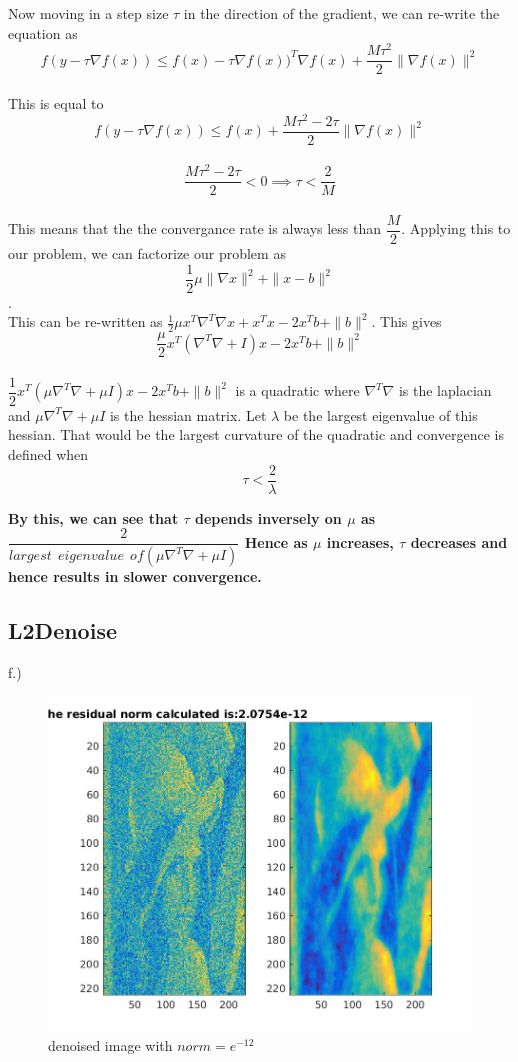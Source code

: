 \documentclass{article}
\begin{document}
Now moving in a step size $\tau$ in the direction of the gradient, we can re-write the equation as
$$f(y- \tau \nabla f(x)) \leq f(x) - \tau \nabla f(x))^T \nabla f(x) +\dfrac{M \tau^2}{2}\| \nabla f(x)\|^2$$ \\

This is equal to $$f(y- \tau \nabla f(x)) \leq f(x) + \dfrac{M \tau^2 -2 \tau}{2}\| \nabla f(x)\|^2$$\\

 $$\dfrac{M \tau^2 -2 \tau}{2} < 0 \implies \tau < \dfrac{2}{M}$$\\

This means that the the convergance rate is always less than $\dfrac{M}{2}$. Applying this to our problem, we can factorize our problem as $$\frac{1}{2} \mu \|\nabla x\|^2 + \|x - b\|^2 $$. \\

This can be re-written as $\frac{1}{2} \mu x^T \nabla^T \nabla x + x^Tx -2x^Tb + \|b\|^2$. This gives $$ \dfrac{\mu }{2} x^T(\nabla^T \nabla + I)x -2x^Tb + \|b\|^2$$\\

$ \dfrac{1}{2} x^T(\mu \nabla^T \nabla + \mu I)x -2x^Tb + \|b\|^2$ is a quadratic where $\nabla^T \nabla$ is the laplacian and $\mu \nabla^T \nabla + \mu I$ is the hessian matrix. Let $\lambda $ be the largest eigenvalue of this hessian. That would be the largest curvature of the quadratic and convergence is defined when $$\tau < \dfrac{2}{\lambda}$$

\textbf{By this, we can see that $\tau$ depends inversely on $\mu$ as $\dfrac{2}{largest\ \ eigenvalue\ \ of(\mu \nabla^T \nabla + \mu I)}$ Hence as $\mu$ increases, $\tau$ decreases and hence results in slower convergence.}


\subsection{L2Denoise}
f.)
\begin{figure}[H]
\centering
\includegraphics[width=0.5\linewidth]{l2denoise.jpg}
\caption{denoised image with $norm = e^{-12}$}
\end{figure}
\end{document}
